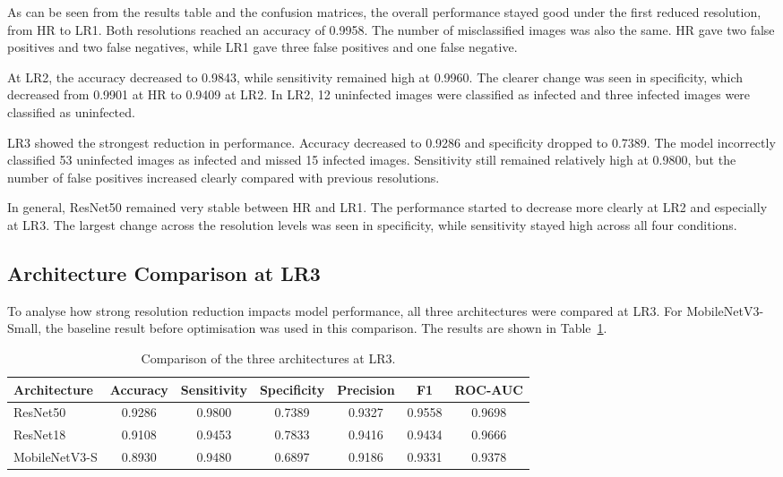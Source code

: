 \FloatBarrier

As can be seen from the results table and the confusion matrices, the overall performance stayed good under the first reduced resolution, from HR to LR1. Both resolutions reached an accuracy of 0.9958. The number of misclassified images was also the same. HR gave two false positives and two false negatives, while LR1 gave three false positives and one false negative.

At LR2, the accuracy decreased to 0.9843, while sensitivity remained high at 0.9960. The clearer change was seen in specificity, which decreased from 0.9901 at HR to 0.9409 at LR2. In LR2, 12 uninfected images were classified as infected and three infected images were classified as uninfected.

LR3 showed the strongest reduction in performance. Accuracy decreased to 0.9286 and specificity dropped to 0.7389. The model incorrectly classified 53 uninfected images as infected and missed 15 infected images. Sensitivity still remained relatively high at 0.9800, but the number of false positives increased clearly compared with previous resolutions.

In general, ResNet50 remained very stable between HR and LR1. The performance started to decrease more clearly at LR2 and especially at LR3. The largest change across the resolution levels was seen in specificity, while sensitivity stayed high across all four conditions.

\subsection{Architecture Comparison at LR3}

To analyse how strong resolution reduction impacts model performance, all three architectures were compared at LR3. For MobileNetV3-Small, the baseline result before optimisation was used in this comparison. The results are shown in Table~\ref{tab:lr3_architecture_results}.

\begin{table}[htbp]
    \centering
    \caption{Comparison of the three architectures at LR3.}
    \label{tab:lr3_architecture_results}

    \small
    \setlength{\tabcolsep}{4pt}

    \begin{tabular}{|l|c|c|c|c|c|c|}
        \hline
        \textbf{Architecture} & \textbf{Accuracy} & \textbf{Sensitivity} &
        \textbf{Specificity} & \textbf{Precision} & \textbf{F1} &
        \textbf{ROC-AUC} \\ \hline
        ResNet50 & 0.9286 & 0.9800 & 0.7389 & 0.9327 & 0.9558 & 0.9698 \\ \hline
        ResNet18 & 0.9108 & 0.9453 & 0.7833 & 0.9416 & 0.9434 & 0.9666 \\ \hline
        MobileNetV3-S & 0.8930 & 0.9480 & 0.6897 & 0.9186 & 0.9331 & 0.9378 \\ \hline
    \end{tabular}
\end{table}

